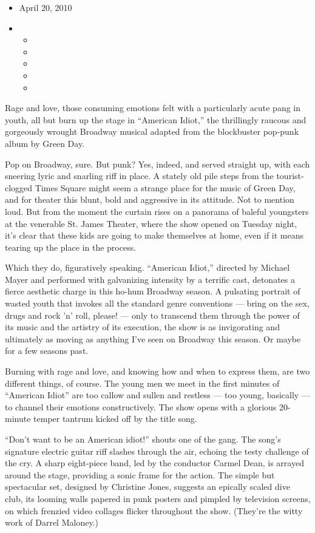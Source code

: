 \begin{itemize}
\item
  April 20, 2010
\item
  \begin{itemize}
  \item
  \item
  \item
  \item
  \item
  \end{itemize}
\end{itemize}

Rage and love, those consuming emotions felt with a particularly acute
pang in youth, all but burn up the stage in ``American Idiot,'' the
thrillingly raucous and gorgeously wrought Broadway musical adapted from
the blockbuster pop-punk album by Green Day.

Pop on Broadway, sure. But punk? Yes, indeed, and served straight up,
with each sneering lyric and snarling riff in place. A stately old pile
steps from the tourist-clogged Times Square might seem a strange place
for the music of Green Day, and for theater this blunt, bold and
aggressive in its attitude. Not to mention loud. But from the moment the
curtain rises on a panorama of baleful youngsters at the venerable St.
James Theater, where the show opened on Tuesday night, it's clear that
these kids are going to make themselves at home, even if it means
tearing up the place in the process.

Which they do, figuratively speaking. ``American Idiot,'' directed by
Michael Mayer and performed with galvanizing intensity by a terrific
cast, detonates a fierce aesthetic charge in this ho-hum Broadway
season. A pulsating portrait of wasted youth that invokes all the
standard genre conventions --- bring on the sex, drugs and rock 'n'
roll, please! --- only to transcend them through the power of its music
and the artistry of its execution, the show is as invigorating and
ultimately as moving as anything I've seen on Broadway this season. Or
maybe for a few seasons past.

Burning with rage and love, and knowing how and when to express them,
are two different things, of course. The young men we meet in the first
minutes of ``American Idiot'' are too callow and sullen and restless ---
too young, basically --- to channel their emotions constructively. The
show opens with a glorious 20-minute temper tantrum kicked off by the
title song.

``Don't want to be an American idiot!'' shouts one of the gang. The
song's signature electric guitar riff slashes through the air, echoing
the testy challenge of the cry. A sharp eight-piece band, led by the
conductor Carmel Dean, is arrayed around the stage, providing a sonic
frame for the action. The simple but spectacular set, designed by
Christine Jones, suggests an epically scaled dive club, its looming
walls papered in punk posters and pimpled by television screens, on
which frenzied video collages flicker throughout the show. (They're the
witty work of Darrel Maloney.)

